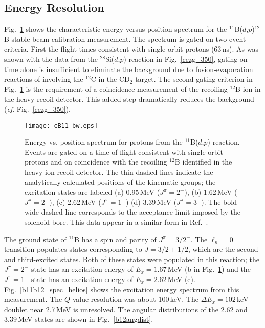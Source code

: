 \subsection{Energy Resolution}
Fig.~\ref{b11_spec} shows the characteristic energy versus position spectrum for the $^{11}$B($d$,$p$)$^{12}$B stable beam calibration measurement.  The spectrum is gated on two event criteria.  First the flight times consistent with single-orbit protons (63\,ns).  As was shown with the data from the $^{28}$Si($d$,$p$) reaction in Fig.~\ref{cezg_350}, gating on time alone is insufficient to eliminate the background due to fusion-evaporation reactions  of involving the $^{12}$C in the CD$_2$ target.  The second gating criterion in Fig.~\ref{b11_spec} is the requirement of a coincidence measurement of the recoiling $^{12}$B ion in the heavy recoil detector.  This added step dramatically reduces the background (\textit{cf}. Fig.~\ref{cezg_350}).  
\begin{figure}[t]
\centering
\texttt{[image: cB11\_bw.eps]}%
\caption[Energy vs. position spectrum for protons from the $^{11}$B($d$,$p$) reaction]{Energy vs. position spectrum for protons from the $^{11}$B($d$,$p$) reaction.  Events are gated on a time-of-flight consistent with single-orbit protons and on coincidence with the recoiling $^{12}$B identified in the heavy ion recoil detector.  The thin dashed lines indicate the analytically calculated positions of the kinematic groups;  the excitation states are labeled (a) 0.95\,MeV ($J^\pi=2^+$), (b) 1.62\,MeV ($J^\pi=2^-$), (c) 2.62\,MeV ($J^\pi=1^-$) (d) 3.39\,MeV ($J^\pi=3^-$). The bold wide-dashed line corresponds to the acceptance limit imposed by the solenoid bore.  This data appear in a similar form in Ref.~\cite[Fig.~2]{Schiffer_2010}. }%
\label{b11_spec}%
\end{figure}

The ground state of $^{11}$B has a spin and parity of $J^\pi=3/2^-$.  The $\ell_n=0$ transition populates states corresponding to $J=3/2\pm1/2$, which are the second- and third-excited states.  Both of these states were populated in this reaction; the $J^\pi=2^-$ state has an excitation energy of $E_x=1.67$\,MeV (b in Fig.~\ref{b11_spec}) and the $J^\pi=1^-$ state has an excitation energy of $E_x=2.62$\,MeV (c).  Fig.~\ref{b11b12_spec_helios} shows the excitation energy spectrum from this measurement. The $Q$-value resolution was about 100\,keV.   The $\Delta E_x=102$\,keV doublet near 2.7\,MeV  is unresolved.  The angular distributions of the 2.62 and 3.39\,MeV states are shown in Fig.~\ref{b12angdist}.  


